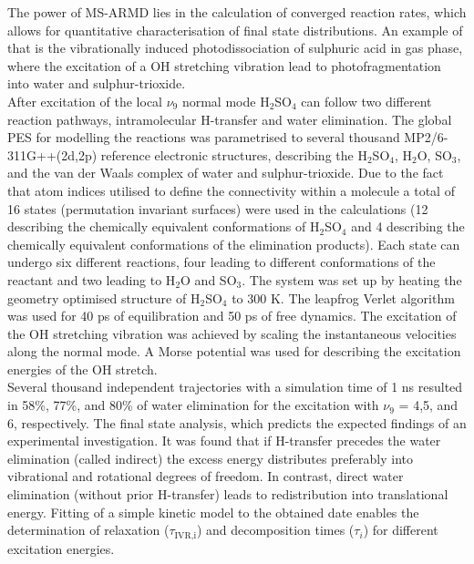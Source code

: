 \documentclass[journal=jacsat,manuscript=article]{achemso}
\begin{document}
\noindent
The power of MS-ARMD lies in the calculation of converged reaction rates, which allows for quantitative characterisation of final state distributions. An example of that is the vibrationally induced photodissociation of sulphuric acid in gas phase, where the excitation of a OH stretching vibration lead to photofragmentation into water and sulphur-trioxide\cite{reyes.pccp.2014.msarmd}. \\
\noindent After excitation of the local $\nu_9$ normal mode H$_2$SO$_4$ can follow two different reaction pathways, intramolecular H-transfer and water elimination. The global PES for modelling the reactions was parametrised to several thousand MP2/6-311G++(2d,2p) reference electronic structures, describing the H$_2$SO$_4$, H$_2$O, SO$_3$, and the van der Waals complex of water and sulphur-trioxide. Due to the fact that atom indices utilised to define the connectivity within a molecule a total of 16 states (permutation invariant surfaces) were used in the calculations (12 describing the chemically equivalent conformations of H$_2$SO$_4$ and 4 describing the chemically equivalent conformations of the elimination products). Each state can undergo six different reactions, four leading to different conformations of the reactant and two leading to H$_2$O and SO$_3$. The system was set up by heating the geometry optimised structure of H$_2$SO$_4$ to 300 K. The leapfrog Verlet algorithm was used for 40 ps of equilibration and 50 ps of free dynamics. The excitation of the OH stretching vibration was achieved by scaling the instantaneous velocities along the normal mode. A Morse potential was used for describing the excitation energies of the OH stretch.\\
\noindent Several thousand independent trajectories with a simulation time of 1 ns resulted in 58\%, 77\%, and 80\% of water elimination for the excitation with $\nu_9$ = 4,5, and 6, respectively. The final state analysis, which predicts the expected findings of an experimental investigation. It was found that if H-transfer precedes the water elimination (called indirect) the excess energy distributes preferably into vibrational and rotational degrees of freedom. In contrast, direct water elimination (without prior H-transfer) leads to redistribution into translational energy. Fitting of a simple kinetic model to the obtained date enables the determination of relaxation ($\tau_{\text{IVR,i}}$) and decomposition times ($\tau_i$) for different excitation energies.\\
\end{document}
